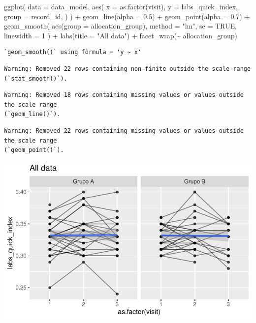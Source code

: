 \documentclass[
  letterpaper,
  DIV=11,
  numbers=noendperiod]{scrartcl}
\newenvironment{Shaded}{\begin{snugshade}}{\end{snugshade}}
\newcommand{\AttributeTok}[1]{\textcolor[rgb]{0.40,0.45,0.13}{#1}}
\newcommand{\ConstantTok}[1]{\textcolor[rgb]{0.56,0.35,0.01}{#1}}
\newcommand{\DecValTok}[1]{\textcolor[rgb]{0.68,0.00,0.00}{#1}}
\newcommand{\FloatTok}[1]{\textcolor[rgb]{0.68,0.00,0.00}{#1}}
\newcommand{\FunctionTok}[1]{\textcolor[rgb]{0.28,0.35,0.67}{#1}}
\newcommand{\NormalTok}[1]{\textcolor[rgb]{0.00,0.23,0.31}{#1}}
\newcommand{\SpecialCharTok}[1]{\textcolor[rgb]{0.37,0.37,0.37}{#1}}
\newcommand{\StringTok}[1]{\textcolor[rgb]{0.13,0.47,0.30}{#1}}
\begin{document}
\begin{Shaded}
\begin{Highlighting}[]
\FunctionTok{ggplot}\NormalTok{(}
    \AttributeTok{data =}\NormalTok{ data\_model, }
    \FunctionTok{aes}\NormalTok{(}
        \AttributeTok{x =} \FunctionTok{as.factor}\NormalTok{(visit),}
        \AttributeTok{y =}\NormalTok{ labs\_quick\_index,}
        \AttributeTok{group =}\NormalTok{ record\_id,}
\NormalTok{    )}
\NormalTok{) }\SpecialCharTok{+}
    \FunctionTok{geom\_line}\NormalTok{(}\AttributeTok{alpha =} \FloatTok{0.5}\NormalTok{) }\SpecialCharTok{+}
    \FunctionTok{geom\_point}\NormalTok{(}\AttributeTok{alpha =} \FloatTok{0.7}\NormalTok{) }\SpecialCharTok{+}
    \FunctionTok{geom\_smooth}\NormalTok{(}
        \FunctionTok{aes}\NormalTok{(}\AttributeTok{group =}\NormalTok{ allocation\_group),}
        \AttributeTok{method =} \StringTok{"lm"}\NormalTok{,}
        \AttributeTok{se =} \ConstantTok{TRUE}\NormalTok{,}
        \AttributeTok{linewidth =} \DecValTok{1}
\NormalTok{    ) }\SpecialCharTok{+}
    \FunctionTok{labs}\NormalTok{(}\AttributeTok{title =} \StringTok{"All data"}\NormalTok{) }\SpecialCharTok{+}
    \FunctionTok{facet\_wrap}\NormalTok{(}\SpecialCharTok{\textasciitilde{}}\NormalTok{ allocation\_group) }
\end{Highlighting}
\end{Shaded}

\begin{verbatim}
`geom_smooth()` using formula = 'y ~ x'
\end{verbatim}

\begin{verbatim}
Warning: Removed 22 rows containing non-finite outside the scale range
(`stat_smooth()`).
\end{verbatim}

\begin{verbatim}
Warning: Removed 18 rows containing missing values or values outside the scale range
(`geom_line()`).
\end{verbatim}

\begin{verbatim}
Warning: Removed 22 rows containing missing values or values outside the scale range
(`geom_point()`).
\end{verbatim}

\includegraphics{Outcomes_V1V2V3_files/figure-pdf/labs_quick_index_6-1.pdf}
\end{document}
